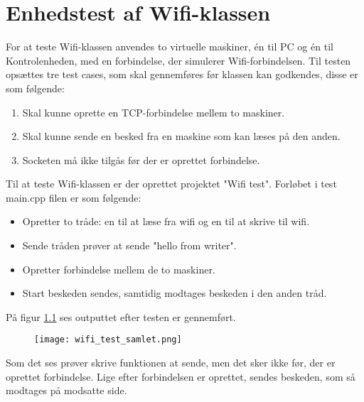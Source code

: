 \chapter{Enhedstest af Wifi-klassen}
\label{appendix:BilagEnhedstestWifi}

For at teste Wifi-klassen anvendes to virtuelle maskiner, én til PC og én til Kontrolenheden, med en forbindelse, der simulerer Wifi-forbindelsen. 
Til testen opsættes tre test cases, som skal gennemføres før klassen kan godkendes, disse er som følgende:
	
	\begin{enumerate}
	\item Skal kunne oprette en TCP-forbindelse mellem to maskiner.
	\item Skal kunne sende en besked fra en maskine som kan læses på den anden.
	\item Socketen må ikke tilgås før der er oprettet forbindelse.
	\end{enumerate}
	
Til at teste Wifi-klassen er der oprettet projektet "Wifi test".
Forløbet i test main.cpp filen er som følgende:
	\begin{itemize}
	\item Opretter to tråde: en til at læse fra wifi og en til at skrive til wifi.
	\item Sende tråden prøver at sende "hello from writer".
	\item Opretter forbindelse mellem de to maskiner.
	\item Start beskeden sendes, samtidig modtages beskeden i den anden tråd.
	\end{itemize}

På figur \ref{fig:wifi_test_samlet} ses outputtet efter testen er gennemført.

\begin{figure} [H]
\centering
	\texttt{[image: wifi\_test\_samlet.png]}
	\label{fig:wifi_test_samlet}
\end{figure}

Som det ses prøver skrive funktionen at sende, men det sker ikke før, der er oprettet forbindelse. 
Lige efter forbindelsen er oprettet, sendes beskeden, som så modtages på modsatte side.
